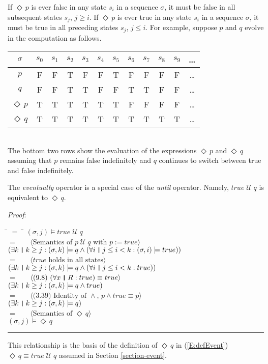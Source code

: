 \documentclass[12pt, fleqn, leqno]{article}
\newcommand{\lgap}{2pt}                             %
\newcommand{\lllgap}{12pt}                          %
\newcommand{\mymathindent}{24pt}                    %
\newcommand{\Until}{\;\mathcal{U}\;}
\newcommand{\Event}{\Diamond\,}
\newcommand{\myqed}{\rule[-.23ex]{1.2ex}{2.0ex}}
\newcommand{\myqedtab}{\hspace{384pt}}              %
\newcommand{\thedr}{\rule[-.25ex]{.32mm}{1.75ex}}   %
\newcommand{\dr}{\;\,\thedr\,\;}                    %
\newcommand{\rb}{:}                                 %
\newcommand{\all}{\forall}                          %
\newcommand{\ext}{\exists}                          %
\newcommand{\Gll} {\langle}                         %
\newcommand{\Ggg} {\rangle}                         %
\newcommand{\Hint}[1]     {\ \ \ $\Gll              \mbox{#1} \Ggg$ }   %
\begin{document}
If $\Event p$ is ever false in any state $s_i$ in a sequence $\sigma$, it must be false in all subsequent states $s_j$, $j\ge i$.
If $\Event p$ is ever true in any state $s_i$ in a sequence $\sigma$, it must be true in all preceding states $s_j$, $j\le i$.
For example, suppose $p$ and $q$ evolve in the computation as follows.\\[\lllgap]
\begin{tabular}{c|ccccccccccc}
  $\sigma$       & $s_0$ & $s_1$ & $s_2$ & $s_3$ & $s_4$ & $s_5$ & $s_6$ & $s_7$ & $s_8$& $s_9$  & \dots \\
  \hline
  $p$            & F     & F     & T     & F     & F     & T     & F     & F     & F     & F     &  \dots\\
  $q$            & F     & F     & T     & T     & F     & F     & T     & T     & F     & F     &  \dots\\
  $\Event p$     & T     & T     & T     & T     & T     & T     & F     & F     & F     & F     &  \dots\\
  $\Event q$     & T     & T     & T     & T     & T     & T     & T     & T     & T     & T     &  \dots\\
\end{tabular}\\[\lllgap]
The bottom two rows show the evaluation of the expressions $\Event p$ and $\Event q$
assuming that $p$ remains false indefinitely and $q$ continues to switch between true and false indefinitely.

The \textit{eventually} operator is a special case of the \textit{until} operator.
Namely, $true \Until q$ is equivalent to $\Event q$.

\emph{Proof}:
\begin{tabbing}
\hspace{\mymathindent} \= $= \;$ \= \myqedtab \= \kill
	\> \>   $(\sigma, j) \models true\Until q$\\[\lgap]
	\> $=$  \>  \Hint{Semantics of $p\Until q$ with $p:=true$}\\[\lgap]
	\> \>   $(\ext k \dr k \ge j \rb (\sigma,k) \models q \land (\all i \dr j\le i < k \rb (\sigma,i) \models true))$\\[\lgap]
	\> $=$  \>  \Hint{$true$ holds in all states}\\[\lgap]
	\> \>   $(\ext k \dr k \ge j \rb (\sigma,k) \models q \land (\all i \dr j\le i < k \rb true))$\\[\lgap]
	\> $=$  \>  \Hint{(9.8) $(\all x\dr R\rb true)\equiv true$}\\[\lgap]
	\> \>   $(\ext k \dr k \ge j \rb (\sigma,k) \models q \land true)$\\[\lgap]
	\> $=$  \>  \Hint{(3.39) Identity of $\land$, $p \land true \equiv p$}\\[\lgap]
	\> \>   $(\ext k \dr k \ge j \rb (\sigma,k) \models q)$\\[\lgap]
	\> $=$  \>  \Hint{Semantics of $\Event q$}\\[\lgap]
	\> \>   $(\sigma, j) \models \Event q$ \quad \myqed
\end{tabbing}
This relationship is the basis of the definition of $\Event q$ in (\ref{E:defEvent}) $\Event q \equiv true \Until q$
assumed in Section \ref{section-event}.
\end{document}
